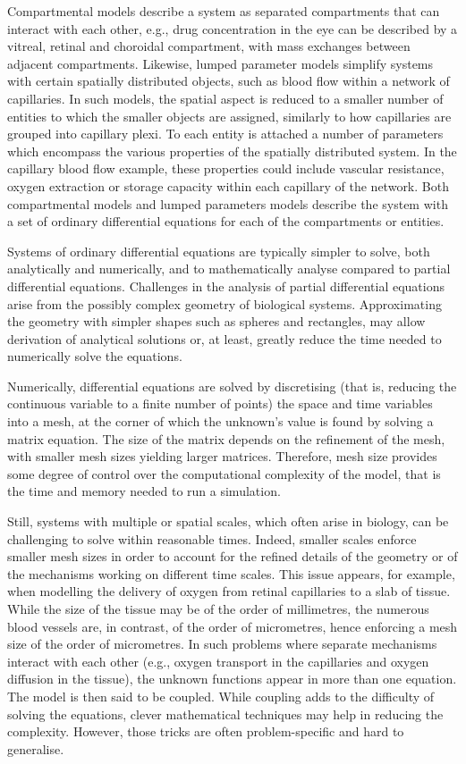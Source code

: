 \documentclass[12pt,a4paper]{article}
\begin{document}
Compartmental models describe a system as separated compartments that can interact with each other, e.g., drug concentration in the eye can be described by a vitreal, retinal and choroidal compartment, with mass exchanges between adjacent compartments.
Likewise, lumped parameter models simplify systems with certain spatially distributed objects, such as blood flow within a network of capillaries.
In such models, the spatial aspect is reduced to a smaller number of entities to which the smaller objects are assigned, similarly to how capillaries are grouped into capillary plexi.
To each entity is attached a number of parameters which encompass the various properties of the spatially distributed system.
In the capillary blood flow example, these properties could include vascular resistance, oxygen extraction or storage capacity within each capillary of the network.
Both compartmental models and lumped parameters models describe the system with a set of ordinary differential equations for each of the compartments or entities.

Systems of ordinary differential equations are typically simpler to solve, both analytically and numerically, and to mathematically analyse compared to partial differential equations.
Challenges in the analysis of partial differential equations arise from the possibly complex geometry of biological systems.
Approximating the geometry with simpler shapes such as spheres and rectangles, may allow derivation of analytical solutions or, at least, greatly reduce the time needed to numerically solve the equations.

Numerically, differential equations are solved by discretising (that is, reducing the continuous variable to a finite number of points) the space and time variables into a mesh, at the corner of which the unknown's value is found by solving a matrix equation.
The size of the matrix depends on the refinement of the mesh, with smaller mesh sizes yielding larger matrices.
Therefore, mesh size provides some degree of control over the computational complexity of the model, that is the time and memory needed to run a simulation.

Still, systems with multiple or spatial scales, which often arise in biology, can be challenging to solve within reasonable times.
Indeed, smaller scales enforce smaller mesh sizes in order to account for the refined details of the geometry or of the mechanisms working on different time scales.
This issue appears, for example, when modelling the delivery of oxygen from retinal capillaries to a slab of tissue.
While the size of the tissue may be of the order of millimetres, the numerous blood vessels are, in contrast, of the order of micrometres, hence enforcing a mesh size of the order of micrometres.
In such problems where separate mechanisms interact with each other (e.g., oxygen transport in the capillaries and oxygen diffusion in the tissue), the unknown functions appear in more than one equation.
The model is then said to be coupled.
While coupling adds to the difficulty of solving the equations, clever mathematical techniques may help in reducing the complexity.
However, those tricks are often problem-specific and hard to generalise.
\end{document}
